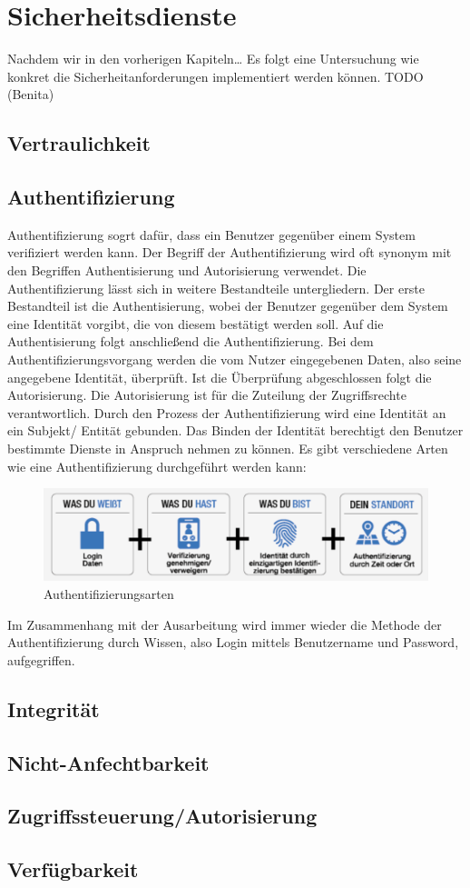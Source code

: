 \chapter{Sicherheitsdienste}\label{Sicherheitsdienste}

Nachdem wir in den vorherigen Kapiteln\dots
Es folgt eine Untersuchung wie konkret die Sicherheitanforderungen implementiert werden können.
TODO (Benita)

\section{Vertraulichkeit}
\section{Authentifizierung}

Authentifizierung sogrt dafür, dass ein Benutzer gegenüber einem System verifiziert werden kann.
Der Begriff der Authentifizierung wird oft synonym mit den Begriffen Authentisierung und Autorisierung verwendet. 
Die Authentifizierung lässt sich in weitere Bestandteile untergliedern. Der erste Bestandteil ist die Authentisierung, 
wobei der Benutzer gegenüber dem System eine Identität vorgibt, die von diesem bestätigt werden soll. 
Auf die Authentisierung folgt anschließend die Authentifizierung. Bei dem Authentifizierungsvorgang werden die vom Nutzer 
eingegebenen Daten, also seine angegebene Identität, überprüft. Ist die Überprüfung abgeschlossen folgt die 
Autorisierung. Die Autorisierung ist für die Zuteilung der Zugriffsrechte verantwortlich. 
Durch den Prozess der Authentifizierung wird eine Identität an ein Subjekt/ Entität gebunden. 
Das Binden der Identität berechtigt den Benutzer bestimmte Dienste in Anspruch nehmen zu können. 
\newline
Es gibt verschiedene Arten wie eine Authentifizierung durchgeführt werden kann:
\begin{figure}[H]
    \centering
    \includegraphics[width=\textwidth]{images/authent_pos1.png}
    \caption[Authentifizierungsarten]{Authentifizierungsarten} 
    \label{Authentifizierungsarten}
\end{figure} 

Im Zusammenhang mit der Ausarbeitung wird immer wieder die Methode der Authentifizierung durch Wissen, 
also Login mittels Benutzername und Password, aufgegriffen. 


\section{Integrität}
\section{Nicht-Anfechtbarkeit}
\section{Zugriffssteuerung/Autorisierung}
\section{Verfügbarkeit}